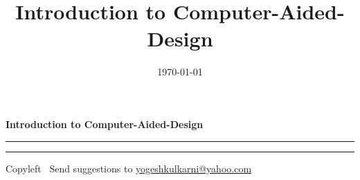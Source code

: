 

\usepackage{beamerarticle}
\usepackage{listings}
%
%


\title[Intro to CAD \hspace{4cm} \insertframenumber /\inserttotalframenumber]{Introduction to Computer-Aided-Design}  
\subtitle[]{}
\date[2014]{\today} 






\raggedright
\footnotesize
\begin{center}
     \Large{\textbf{Introduction to Computer-Aided-Design}}  
\end{center}
\rule{\linewidth}{0.25pt}

\begin{multicols}{3}




\rule{\linewidth}{0.25pt}
\scriptsize
Copyleft \textcopyleft\  Send suggestions to 
\href{http://www.yogeshkulkarni.com}{yogeshkulkarni@yahoo.com}


\end{multicols}





